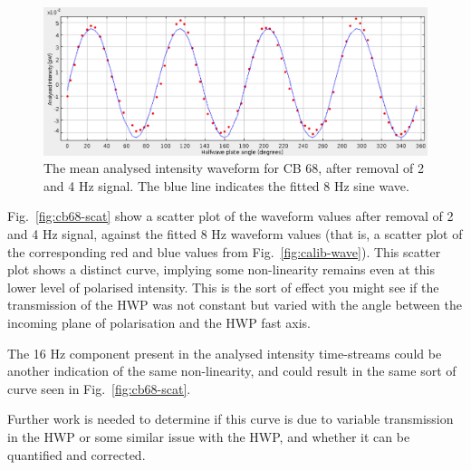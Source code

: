 \documentclass[twoside,11pt]{starlink}
\begin{document}
\begin{figure}
\includegraphics[width=\columnwidth]{cb68-wave}
\caption{The mean analysed intensity waveform for CB 68, after removal of
2 and 4 Hz signal. The blue line indicates the fitted 8 Hz sine wave.}
\label{fig:cb68-wave}
\end{figure}

Fig.~\ref{fig:cb68-scat} show a scatter plot of the waveform values after
removal of 2 and 4 Hz signal, against the fitted 8 Hz waveform values
(that is, a scatter plot of the corresponding red and blue values from
Fig.~\ref{fig:calib-wave}). This scatter plot shows a distinct curve,
implying some non-linearity remains even at this lower level of
polarised intensity. This is the sort of effect you might see if the
transmission of the HWP was not constant but varied with the angle
between the incoming plane of polarisation and the HWP fast axis.

The 16 Hz component present in the analysed intensity time-streams could
be another indication of the same non-linearity, and could result in the
same sort of curve seen in Fig.~\ref{fig:cb68-scat}.

Further work is needed to determine if this curve is due to variable
transmission in the HWP or some similar issue with the HWP, and whether
it can be quantified and corrected.
\end{document}
